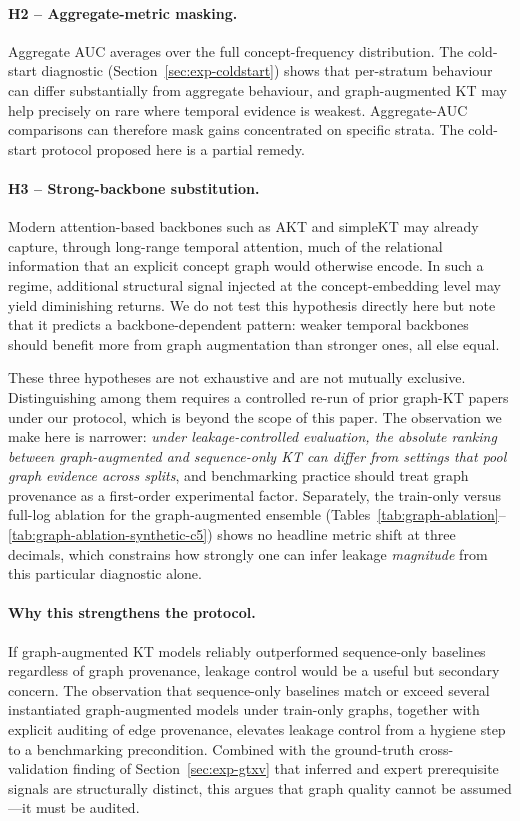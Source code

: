 \paragraph{H2 -- Aggregate-metric masking.}
Aggregate AUC averages over the full concept-frequency distribution.
The cold-start diagnostic (Section~\ref{sec:exp-coldstart}) shows that
per-stratum behaviour can differ substantially from aggregate
behaviour, and graph-augmented KT may help precisely on rare \KCs{}
where temporal evidence is weakest. Aggregate-AUC comparisons can
therefore mask gains concentrated on specific strata. The cold-start
protocol proposed here is a partial remedy.

\paragraph{H3 -- Strong-backbone substitution.}
Modern attention-based backbones such as AKT and simpleKT may already
capture, through long-range temporal attention, much of the relational
information that an explicit concept graph would otherwise encode. In
such a regime, additional structural signal injected at the
concept-embedding level may yield diminishing returns. We do not test
this hypothesis directly here but note that it predicts a
backbone-dependent pattern: weaker temporal backbones should benefit
more from graph augmentation than stronger ones, all else equal.

These three hypotheses are not exhaustive and are not mutually
exclusive. Distinguishing among them requires a controlled re-run of
prior graph-KT papers under our protocol, which is beyond the scope
of this paper. The observation we make here is narrower:
\emph{under leakage-controlled evaluation, the absolute ranking between
graph-augmented and sequence-only KT can differ from settings that pool graph
evidence across splits}, and benchmarking practice should treat graph provenance
as a first-order experimental factor.
Separately, the train-only versus full-log ablation for the graph-augmented ensemble
(Tables~\ref{tab:graph-ablation}--\ref{tab:graph-ablation-synthetic-c5}) shows no headline metric shift at three decimals,
which constrains how strongly one can infer leakage \emph{magnitude} from this
particular diagnostic alone.

\paragraph{Why this strengthens the protocol.}
If graph-augmented KT models reliably outperformed sequence-only
baselines regardless of graph provenance, leakage control would be a
useful but secondary concern.
The observation that sequence-only baselines match or exceed several instantiated
graph-augmented models under train-only graphs, together with explicit auditing of edge
provenance, elevates leakage control from a hygiene step to a benchmarking
precondition.
Combined with the ground-truth cross-validation finding of Section~\ref{sec:exp-gtxv}
that inferred and expert prerequisite signals are structurally
distinct, this argues that graph quality cannot be assumed---it must
be audited.


